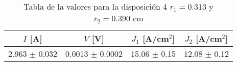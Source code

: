 \begin{table}[H]
    \centering
\begin{tabular}{cccc}
\toprule
$I$ [A] & $V$ [V] & $J_1$ [A/cm$^2$] & $J_2$ [A/cm$^2$] \\
\midrule
2.963 $\pm$ 0.032 & 0.0013 $\pm$ 0.0002 & 15.06 $\pm$ 0.15 & 12.08 $\pm$ 0.12 \\
\bottomrule
\end{tabular}
    \caption{Tabla de la valores para la disposición 4 $r_1=0.313$ y $r_2=0.390$ cm }
    \label{Tab:VIJ_mini_4}
\end{table}
